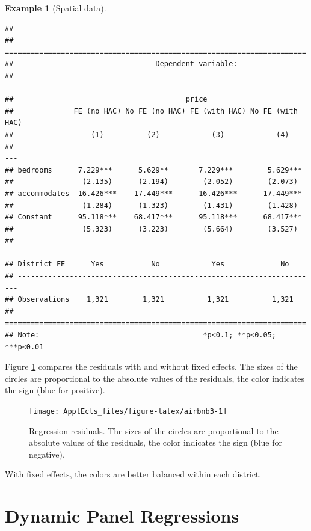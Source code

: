 \documentclass[
  12pt,
]{book}
\theoremstyle{definition}
\theoremstyle{definition}
\newtheorem{example}{Example}[chapter]
\theoremstyle{definition}
\theoremstyle{definition}
\theoremstyle{remark}
\begin{document}
\begin{example}[Spatial data]
\begin{verbatim}
## 
## ======================================================================
##                                 Dependent variable:                   
##              ---------------------------------------------------------
##                                        price                          
##              FE (no HAC) No FE (no HAC) FE (with HAC) No FE (with HAC)
##                  (1)          (2)            (3)            (4)       
## ----------------------------------------------------------------------
## bedrooms      7.229***      5.629**       7.229***        5.629***    
##                (2.135)      (2.194)        (2.052)        (2.073)     
## accommodates  16.426***    17.449***      16.426***      17.449***    
##                (1.284)      (1.323)        (1.431)        (1.428)     
## Constant      95.118***    68.417***      95.118***      68.417***    
##                (5.323)      (3.223)        (5.664)        (3.527)     
## ----------------------------------------------------------------------
## District FE      Yes           No            Yes             No       
## ----------------------------------------------------------------------
## Observations    1,321        1,321          1,321          1,321      
## ======================================================================
## Note:                                      *p<0.1; **p<0.05; ***p<0.01
\end{verbatim}

Figure \ref{fig:airbnb3} compares the residuals with and without fixed effects. The sizes of the circles are proportional to the absolute values of the residuals, the color indicates the sign (blue for positive).

\begin{figure}
\texttt{[image: ApplEcts\_files/figure-latex/airbnb3-1]} \caption{Regression residuals. The sizes of the circles are proportional to the absolute values of the residuals, the color indicates the sign (blue for negative).}\label{fig:airbnb3}
\end{figure}

With fixed effects, the colors are better balanced within each district.
\end{example}

\hypertarget{DynPanel}{%
\section{Dynamic Panel Regressions}\label{DynPanel}}
\end{document}
